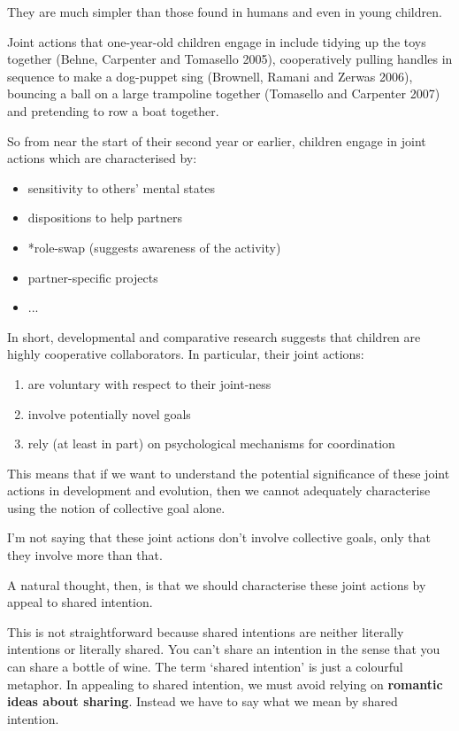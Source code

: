 \documentclass[12pt,a4paper]{extarticle}
\begin{document}
They are much simpler than those found in humans and even in young children.  

Joint actions that one-year-old children engage in include tidying up the toys together (Behne, Carpenter and Tomasello 2005), cooperatively pulling handles in sequence to make a dog-puppet sing (Brownell, Ramani and Zerwas 2006), bouncing a ball on a large trampoline together (Tomasello and Carpenter 2007) and pretending to row a boat together. 

So from near the start of their second year or earlier, children engage in joint actions which are characterised by:
%
\begin{itemize}
\item sensitivity to others' mental states \citep{Buttelmann:2009gy}
\item dispositions to help partners \citep{Warneken:2006qe}
\item *role-swap (suggests awareness of the activity)
\item partner-specific projects \citep{Liebal:2010lr}
\item ...
\end{itemize}
%
In short, developmental and comparative research suggests that children are highly cooperative collaborators.  
In particular, their joint actions:
%
\begin{enumerate}
\item are voluntary with respect to their joint-ness
\item involve potentially novel goals
\item rely (at least in part) on psychological mechanisms for coordination
\end{enumerate}
%
This means that if we want to understand the potential significance of these joint actions in development and evolution, then we cannot adequately characterise using the notion of collective goal alone.

I'm not saying that these joint actions don't involve collective goals, only that they involve more than that.

A natural thought, then, is that we should characterise these joint actions by appeal to shared intention.

This is not straightforward because shared intentions are neither literally intentions or literally shared.  
You can't share an intention in the sense that you can share a bottle of wine.  
The term `shared intention' is just a colourful metaphor.  
In appealing to shared intention, we must avoid relying on \textbf{romantic ideas about sharing}.
Instead we have to say what we mean by shared intention.
\end{document}
